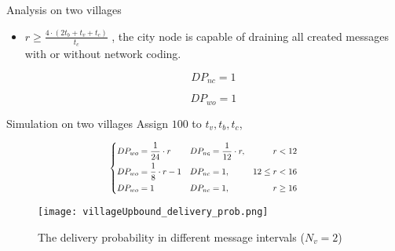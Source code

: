 \documentclass[compress]{beamer}
\begin{document}
\begin{frame}{Analysis on two villages}
\begin{itemize}
		\item $r \ge \frac{4 \cdot(2t_b + t_v + t_c)}{t_c}$
		      , the city node is capable of draining all created messages with or without network coding.
		      
		      \begin{equation}
		      	DP_{nc} = 1
		      \end{equation}
		      
		      \begin{equation}
		      	DP_{wo} = 1
		      \end{equation}
		      
	\end{itemize}
	
\end{frame}

\begin{frame}{Simulation on two villages}
	Assign $100$ to $t_v, t_b, t_c$,
	
	\begin{equation*}
		\resizebox{.5\textwidth}{!}{$\displaystyle %
			\left\{
			\begin{aligned}
				DP_{wo} & = \frac{1}{24} \cdot r    & DP_{nc} & =\frac{1}{12} \cdot r, & r<12          \\
				DP_{wo} & = \frac{1}{8} \cdot r - 1 & DP_{nc} & =1 ,                   & 12 \le r < 16 \\
				DP_{wo} & =1                        & DP_{nc} & = 1,                   & r \ge 16      
			\end{aligned}
			\right.
		$}
	\end{equation*}
	
	\begin{figure}[!t]
		\centering
		\texttt{[image: villageUpbound\_delivery\_prob.png]}
		\caption{The delivery probability in different message intervals ($N_v = 2$)}
		\label{f_delivery_prob}
	\end{figure}
	
\end{frame}
\end{document}
